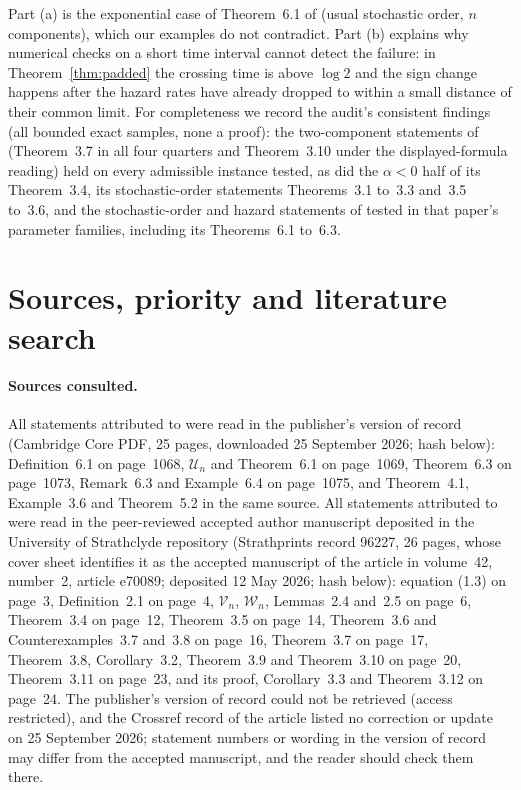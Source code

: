 \documentclass[10pt]{article}
\theoremstyle{plain}
\theoremstyle{definition}
\theoremstyle{remark}
\begin{document}
Part (a) is the exponential case of Theorem~6.1 of \cite{ShojaeeAsadiFinkelstein2022} (usual stochastic order, $n$ components), which our examples do not contradict. Part (b) explains why numerical checks on a short time interval cannot detect the failure: in Theorem~\ref{thm:padded} the crossing time is above $\log 2$ and the sign change happens after the hazard rates have already dropped to within a small distance of their common limit. For completeness we record the audit's consistent findings (all bounded exact samples, none a proof): the two-component statements of \cite{SahooKayalFinkelstein2026} (Theorem~3.7 in all four quarters and Theorem~3.10 under the displayed-formula reading) held on every admissible instance tested, as did the $\alpha<0$ half of its Theorem~3.4, its stochastic-order statements Theorems~3.1 to~3.3 and~3.5 to~3.6, and the stochastic-order and hazard statements of \cite{ShojaeeAsadiFinkelstein2022} tested in that paper's parameter families, including its Theorems~6.1 to~6.3.

\section{Sources, priority and literature search}\label{sec:sources}

\paragraph{Sources consulted.} All statements attributed to \cite{ShojaeeAsadiFinkelstein2022} were read in the publisher's version of record (Cambridge Core PDF, 25 pages, downloaded 25 September 2026; hash below): Definition~6.1 on page~1068, $\mathcal U_n$ and Theorem~6.1 on page~1069, Theorem~6.3 on page~1073, Remark~6.3 and Example~6.4 on page~1075, and Theorem~4.1, Example~3.6 and Theorem~5.2 in the same source. All statements attributed to \cite{SahooKayalFinkelstein2026} were read in the peer-reviewed accepted author manuscript deposited in the University of Strathclyde repository (Strathprints record 96227, 26 pages, whose cover sheet identifies it as the accepted manuscript of the article in volume~42, number~2, article e70089; deposited 12 May 2026; hash below): equation (1.3) on page~3, Definition~2.1 on page~4, $\mathcal V_n$, $\mathcal W_n$, Lemmas~2.4 and~2.5 on page~6, Theorem~3.4 on page~12, Theorem~3.5 on page~14, Theorem~3.6 and Counterexamples~3.7 and~3.8 on page~16, Theorem~3.7 on page~17, Theorem~3.8, Corollary~3.2, Theorem~3.9 and Theorem~3.10 on page~20, Theorem~3.11 on page~23, and its proof, Corollary~3.3 and Theorem~3.12 on page~24. The publisher's version of record could not be retrieved (access restricted), and the Crossref record of the article listed no correction or update on 25 September 2026; statement numbers or wording in the version of record may differ from the accepted manuscript, and the reader should check them there.
\end{document}
